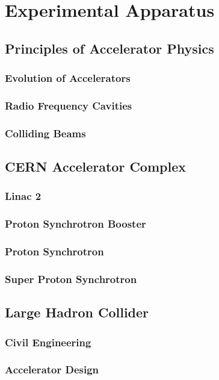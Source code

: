 \chapter{Experimental Apparatus} 

\section{Principles of Accelerator Physics}
\subsection{Evolution of Accelerators}
\subsection{Radio Frequency Cavities}
\subsection{Colliding Beams}

\section{CERN Accelerator Complex}
\subsection{Linac 2}
\subsection{Proton Synchrotron Booster}
\subsection{Proton Synchrotron}
\subsection{Super Proton Synchrotron}

\section{Large Hadron Collider}
\subsection{Civil Engineering}
\subsection{Accelerator Design}
